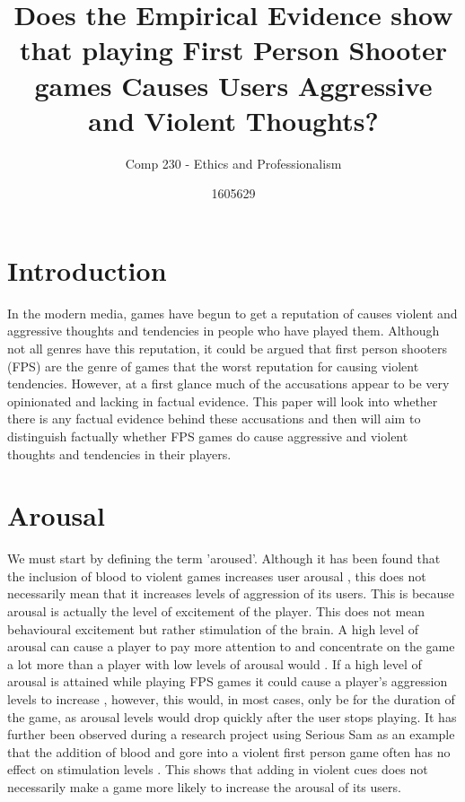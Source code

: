 \documentclass{scrartcl}
\title{Does the Empirical Evidence show that playing First Person Shooter games Causes Users Aggressive and Violent Thoughts? }
\subtitle{Comp 230 - Ethics and Professionalism}
\author{1605629}
\begin{document}
\maketitle


\section{Introduction}
In the modern media, games have begun to get a reputation of causes violent and aggressive thoughts and tendencies in people who have played them. Although not all genres have this reputation, it could be argued that first person shooters (FPS) are the genre of games that the worst reputation for causing violent tendencies. However, at a first glance much of the accusations appear to be very opinionated and lacking in factual evidence. This paper will look into whether there is any factual evidence behind these accusations and then will aim to distinguish factually whether FPS games do cause aggressive and violent thoughts and tendencies in their players.

\section{Arousal}
We must start by defining the term 'aroused'. Although it has been found that the inclusion of blood to violent games increases user arousal \cite {ballard1996mortal}, this does not necessarily mean that it increases levels of aggression of its users. This is because arousal is actually the level of excitement of the player. This does not mean behavioural excitement but rather stimulation of the brain. A high level of arousal can cause a player to pay more attention to and concentrate on the game a lot more than a player with low levels of arousal would \cite {jeong2015brand}. If a high level of arousal is attained while playing FPS games it could cause a player's aggression levels to increase \cite{jeong2015brand}, however, this would, in most cases, only be for the duration of the game, as arousal levels would drop quickly after the user stops playing. It has further been observed during a research project using Serious Sam as an example that the addition of blood and gore into a violent first person game often has no effect on stimulation levels \cite{ashbarry2016blood}. This shows that adding in violent cues does not necessarily make a game more likely to increase the arousal of its users.
\end{document}
